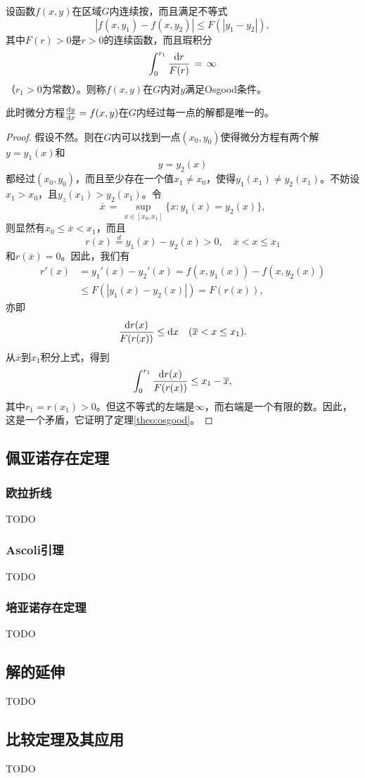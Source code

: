 \begin{theo}\label{theo:osgood}
设函数$f(x,y)$在区域$G$内连续按，而且满足不等式
$$|f(x,y_1)-f(x,y_2)|\leq F(|y_1-y_2|),$$
其中$F(r)>0$是$r>0$的连续函数，而且瑕积分
$$\int_0^{r_1}\frac{\mathrm{d} r}{F(r)}\,=\,\infty$$
（$r_1>0$为常数）。则称$f(x,y)$在$G$内对$y$满足{\heiti Osgood条件}。\par
此时微分方程$\frac{\mathrm{d}{}y}{\mathrm{d}{}x}=f(x,y)$在$G$内经过每一点的解都是唯一的。
\end{theo}
\begin{proof}
假设不然。则在$G$内可以找到一点$(x_0,y_0)$使得微分方程有两个解$y=y_1(x)$和$$y=y_2(x)$$都经过$(x_0,y_0)$，而且至少存在一个值$x_1\neq x_0$，使得$y_1(x_1)\neq y_2(x_1)$。不妨设$x_1>x_0$，且$y_z(x_1)>y_2(x_1)$。令
$$\overline{x}\,=\,\sup_{x\in[x_0,x_1]}\{x:y_1(x)=y_2(x)\},$$
则显然有$x_0\leq\overline{x}<x_1$，而且
$$r(x)\overset{d}{=}y_1(x)-y_2(x)>0,\quad\overline{x}<x\leq x_1$$
和$r(\overline{x})=0$。因此，我们有
\begin{align}
r'(x) &= y_1'(x)-y_2'(x)=f(x,y_1(x))-f(x,y_2(x)) \\
&\leq F(|y_1(x)-y_2(x)|)=F(r(x)),
\end{align}
亦即
$$\frac{\mathrm{d} r(x)}{F(r(x))}\leq\mathrm{d} x\quad(\overline{x}<x\leq x_1).$$
从$\overline{x}$到$x_1$积分上式，得到
$$\int_0^{r_1}\frac{\mathrm{d} r(x)}{F(r(x))}\leq x_1-\overline{x},$$
其中$r_1=r(x_1)>0$。但这不等式的左端是$\infty$，而右端是一个有限的数。因此，这是一个矛盾，它证明了定理\ref{theo:osgood}。
\end{proof}

\subsection{佩亚诺存在定理}
\subsubsection{欧拉折线}
TODO
\subsubsection{Ascoli引理}
TODO
\subsubsection{培亚诺存在定理}
TODO

\subsection{解的延伸}
TODO

\subsection{比较定理及其应用}
TODO

